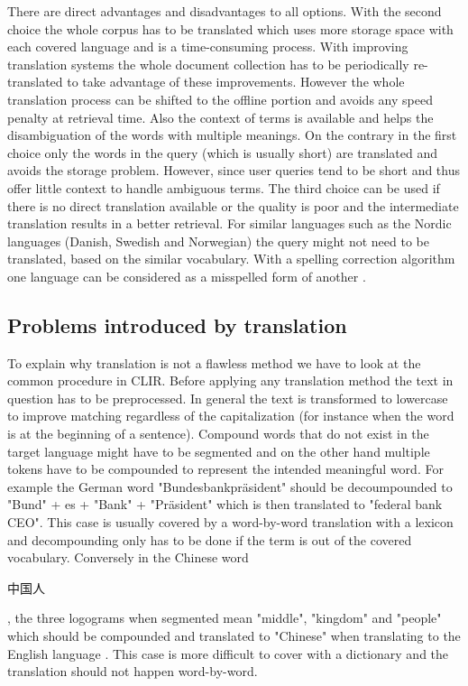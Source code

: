 \documentclass[journal]{IEEEtran}
\begin{document}
There are direct advantages and disadvantages to all options.
With the second choice the whole corpus has to be translated which uses more storage space with each covered language and is a time-consuming process.
With improving translation systems the whole document collection has to be periodically re-translated to take advantage of these improvements.
However the whole translation process can be shifted to the offline portion and avoids any speed penalty at retrieval time.
Also the context of terms is available and helps the disambiguation of the words with multiple meanings.
On the contrary in the first choice only the words in the query (which is usually short) are translated and avoids the storage problem.
However, since user queries tend to be short and thus offer little context to handle ambiguous terms.
The third choice can be used if there is no direct translation available or the quality is poor and the intermediate translation results in a better retrieval.
For similar languages such as the Nordic languages (Danish, Swedish and Norwegian) the query might not need to be translated, based on the similar vocabulary.
With a spelling correction algorithm one language can be considered as a misspelled form of another \cite{peters12}.

\subsection{Problems introduced by translation}
\label{sec:problems}
To explain why translation is not a flawless method we have to look at the common procedure in CLIR.
Before applying any translation method the text in question has to be preprocessed.
In general the text is transformed to lowercase to improve matching regardless of the capitalization (for instance when the word is at the beginning of a sentence).
Compound words that do not exist in the target language might have to be segmented and on the other hand multiple tokens have to be compounded to represent the intended meaningful word.
For example the German word "Bundesbankpr\"{a}sident" should be decoumpounded to "Bund" + es + "Bank" + "Pr\"{a}sident" which is then translated to "federal bank CEO".
This case is usually covered by a word-by-word translation with a lexicon and decompounding only has to be done if the term is out of the covered vocabulary.
Conversely in the Chinese word \begin{CJK}{UTF8}{gbsn}中国人\end{CJK}, the three logograms when segmented mean "middle", "kingdom" and "people" which should be compounded and translated to "Chinese" when translating to the English language \cite{ir13}.
This case is more difficult to cover with a dictionary and the translation should not happen word-by-word.
\end{document}
